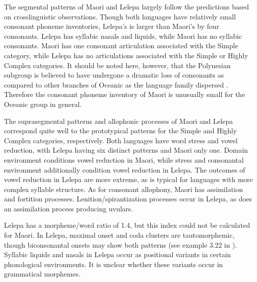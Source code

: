   The segmental patterns of Maori and Lelepa largely follow the predictions based on crosslinguistic observations. Though both languages have relatively small consonant phoneme inventories, Lelepa’s is larger than Maori’s by four consonants. Lelepa has syllabic nasals and liquids, while Maori has no syllabic consonants. Maori has one consonant articulation associated with the Simple category, while Lelepa has no articulations associated with the Simple or Highly Complex categories. It should be noted here, however, that the Polynesian subgroup is believed to have undergone a dramatic loss of consonants as compared to other branches of Oceanic as the language family dispersed \citep{Trudgill2004}. Therefore the consonant phoneme inventory of Maori is unusually small for the Oceanic group in general.

  The suprasegmental patterns and allophonic processes of Maori and Lelepa correspond quite well to the prototypical patterns for the Simple and Highly Complex categories, respectively. Both languages have word stress and vowel reduction, with Lelepa having six distinct patterns and Maori only one. Domain environment conditions vowel reduction in Maori, while stress and consonantal environment additionally condition vowel reduction in Lelepa. The outcomes of vowel reduction in Lelepa are more extreme, as is typical for languages with more complex syllable structure. As for consonant allophony, Maori has assimilation and fortition processes. Lenition/spirantization processes occur in Lelepa, as does an assimilation process producing uvulars.

  Lelepa has a morpheme/word ratio of 1.4, but this index could not be calculated for Maori. In Lelepa, maximal onset and coda clusters are tautomorphemic, though biconsonantal onsets may show both patterns (see example 3.22 in ). Syllabic liquids and nasals in Lelepa occur as positional variants in certain phonological environments. It is unclear whether these variants occur in grammatical morphemes.

